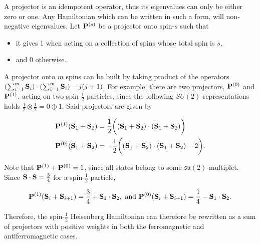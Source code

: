 \documentclass{homework}
\begin{document}
A projector is an idempotent operator, thus its eigenvalues can only be either zero or one. Any Hamiltonian which can be written in such a form, will non-negative eigenvalues. Let ${\bf P}^{(s)}$ be a projector onto spin-$s$ such that 

\begin{itemize}
    \item it gives 1 when acting on a collection of spins whose total spin is $s$, 
    \item and 0 otherwise.
\end{itemize}

A projector onto $m$ spins can be built by taking product of the operators $(\sum_{i=1}^{m} {\bf S}_i) \cdot (\sum_{i=1}^{m} {\bf S}_i) - j(j+1)$. For example, there are two projectors, ${\bf P}^{(0)}$ and ${\bf P}^{(1)}$, acting on two spin-$\frac{1}{2}$ particles, since the following $SU(2)$ representations holds $\frac{1}{2} \otimes \frac{1}{2} = 0 \oplus 1$. Said projectors are given by 

\begin{equation}
    \begin{split}
        &{\bf P}^{(1)} ({\bf S}_1 + {\bf S}_2) = \frac{1}{2} \bigg(({\bf S}_1 + {\bf S}_2) \cdot ({\bf S}_1 + {\bf S}_2)\bigg) \\
        &{\bf P}^{(0)} ({\bf S}_1 + {\bf S}_2) = -\frac{1}{2} \bigg(({\bf S}_1 + {\bf S}_2) \cdot ({\bf S}_1 + {\bf S}_2) - 2\bigg).
    \end{split}
\end{equation}

Note that ${\bf P}^{(1)} + {\bf P}^{(0)} = 1$, since all states belong to some $\mathfrak{s}\mathfrak{u}(2)$-multiplet. Since ${{\bf S}} \cdot {\bf S} = \frac{3}{4}$ for a spin-$\frac{1}{2}$ particle, 

$$
    {\bf P}^{(1)} ({\bf S}_{i} + {\bf S}_{i+1}) = \frac{3}{4} + {\bf S}_1 \cdot {\bf S}_2, \textnormal{ and }
     {\bf P}^{(0)} ({\bf S}_{i} + {\bf S}_{i+1}) = \frac{1}{4} - {\bf S}_1 \cdot {\bf S}_2.
$$

Therefore, the spin-$\frac{1}{2}$ Heisenberg Hamiltonian can therefore be rewritten as a sum of projectors with positive weights in both the ferromagnetic and antiferromagnetic cases. 
\end{document}
